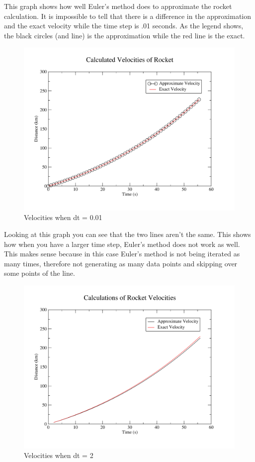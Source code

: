 \documentclass[11pt]{article}
\begin{document}
\newpage
This graph shows how well Euler's method does to approximate the rocket calculation. It is impossible to tell that there is a difference in the approximation and the exact velocity while the time step is .01 seconds. As the legend shows, the black circles (and line) is the approximation while the red line is the exact.
\begin{figure}[H]
\centering
\includegraphics[scale=0.45]{velocity01.pdf}
\caption{Velocities when dt = 0.01}
\end{figure}
\newpage
Looking at this graph you can see that the two lines aren't the same. This shows how when you have a larger time step, Euler's method does not work as well. This makes sense because in this case Euler's method is not being iterated as many times, therefore not generating as many data points and skipping over some points of the line.
\begin{figure}[H]
\centering
\includegraphics[scale=0.45]{velocity2.pdf}
\caption{Velocities when dt = 2}
\end{figure}
\end{document}
